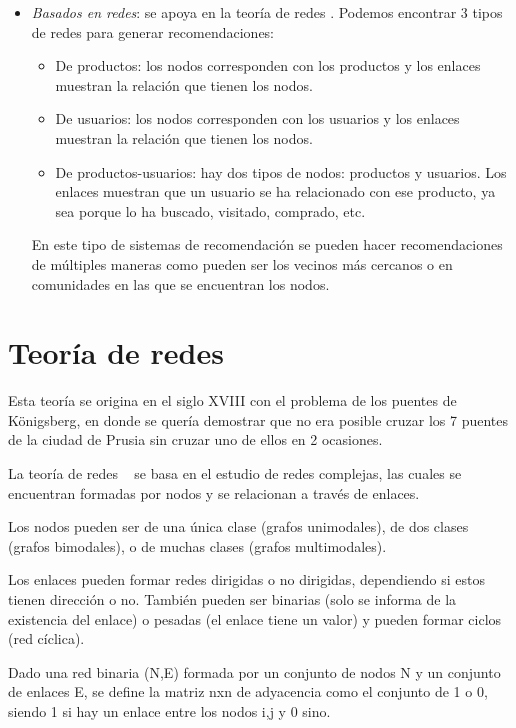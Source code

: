 \begin{itemize}
    \item \textit{Basados en redes}: se apoya en la teoría de redes \cite{wiki:sistRecomBasadosEnRedes}. Podemos encontrar 3 tipos de redes para generar recomendaciones:
    \begin{itemize}
        \item De productos: los nodos corresponden con los productos y los enlaces muestran la relación que tienen los nodos. 
        \item De usuarios: los nodos corresponden con los usuarios y los enlaces muestran la relación que tienen los nodos. 
        \item De productos-usuarios: hay dos tipos de nodos: productos y usuarios. Los enlaces muestran que un usuario se ha relacionado con ese producto, ya sea porque lo ha buscado, visitado, comprado, etc.
    \end{itemize}
    
    En este tipo de sistemas de recomendación se pueden hacer recomendaciones de múltiples maneras como pueden ser los vecinos más cercanos o en comunidades en las que se encuentran los nodos.
    
\end{itemize}

\section{Teoría de redes}
Esta teoría se origina en el siglo XVIII con el problema de los puentes de Königsberg, en donde se quería demostrar que no era posible cruzar los 7 puentes de la ciudad de Prusia sin cruzar uno de ellos en 2 ocasiones.

La teoría de redes ~\cite{wiki:teoriaRedes} se basa en el estudio de redes complejas, las cuales se encuentran formadas por nodos y se relacionan a través de enlaces. 

Los nodos pueden ser de una única clase (grafos unimodales), de dos clases (grafos bimodales), o de muchas clases (grafos multimodales).

Los enlaces pueden formar redes dirigidas o no dirigidas, dependiendo si estos tienen dirección o no. También pueden ser binarias (solo se informa de la existencia del enlace) o pesadas (el enlace tiene un valor) y pueden formar ciclos (red cíclica).

Dado una red binaria (N,E) formada por un conjunto de nodos N y un conjunto de enlaces E, se define la matriz nxn de adyacencia como el conjunto de 1 o 0, siendo 1 si hay un enlace entre los nodos i,j y 0 sino.

